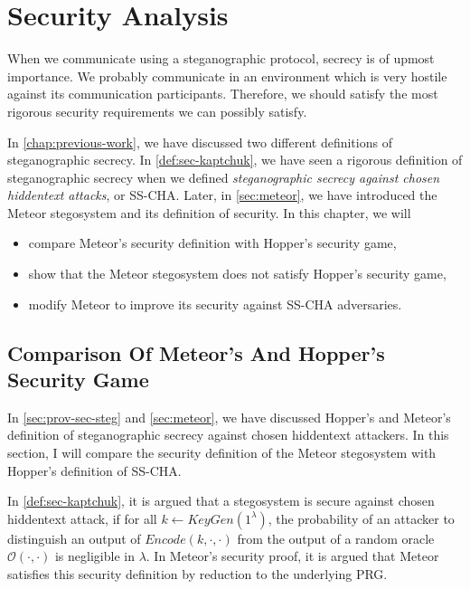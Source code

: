 \chapter{Security Analysis}
\label{chap:security}

When we communicate using a steganographic protocol, secrecy is of upmost importance.
We probably communicate in an environment which is very hostile against its communication participants.
Therefore, we should satisfy the most rigorous security requirements we can possibly satisfy.

In \autoref{chap:previous-work}, we have discussed two different definitions of steganographic secrecy.
In \autoref{def:sec-kaptchuk}, we have seen a rigorous definition of steganographic secrecy when we defined \emph{steganographic secrecy against chosen hiddentext attacks}, or SS-CHA.
Later, in \autoref{sec:meteor}, we have introduced the Meteor stegosystem and its definition of security.
In this chapter, we will
\begin{itemize}
	\item compare Meteor's security definition with Hopper's security game,
	\item show that the Meteor stegosystem does not satisfy Hopper's security game,
	\item modify Meteor to improve its security against SS-CHA adversaries.
\end{itemize}

\section{Comparison Of Meteor's And Hopper's Security Game}

In \autoref{sec:prov-sec-steg} and \autoref{sec:meteor}, we have discussed Hopper's and Meteor's definition of steganographic secrecy against chosen hiddentext attackers. In this section, I will compare the security definition of the Meteor stegosystem with Hopper's definition of SS-CHA.

In \autoref{def:sec-kaptchuk}, it is argued that a stegosystem is secure against chosen hiddentext attack, if for all $k \leftarrow KeyGen(1^\lambda)$, the probability of an attacker to distinguish an output of $Encode(k, \cdot, \cdot)$ from the output of a random oracle $\mathcal{O}(\cdot, \cdot)$ is negligible in $\lambda$. In Meteor's security proof, it is argued that Meteor satisfies this security definition by reduction to the underlying PRG.

